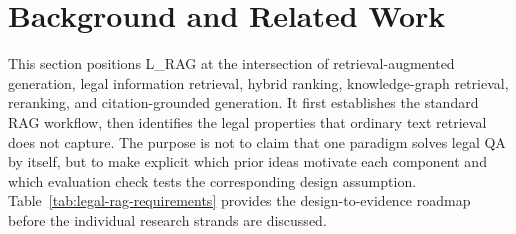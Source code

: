 \section{Background and Related Work}
\label{sec:related-work}

This section positions L\_RAG at the intersection of retrieval-augmented
generation, legal information retrieval, hybrid ranking, knowledge-graph
retrieval, reranking, and citation-grounded generation. It first establishes
the standard RAG workflow, then identifies the legal properties that ordinary
text retrieval does not capture. The purpose is not to claim that one
paradigm solves legal QA by itself, but to make explicit which prior ideas
motivate each component and which evaluation check tests the corresponding
design assumption. Table~\ref{tab:legal-rag-requirements} provides the
design-to-evidence roadmap before the individual research strands are
discussed.

